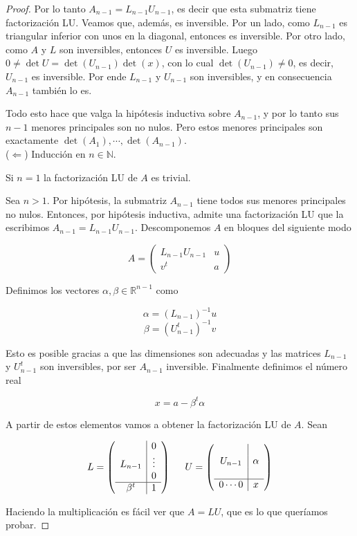 \begin{propo}
\begin{proof}
Por lo tanto $A_{n - 1} = L_{n - 1}U_{n - 1}$, es decir que esta submatriz tiene factorización LU. Veamos que, además, es inversible. Por un lado, como $L_{n - 1}$ es triangular inferior con unos en la diagonal, entonces es inversible. Por otro lado, como $A$ y $L$ son inversibles, entonces $U$ es inversible. Luego $0 \neq \det U = \det(U_{n - 1}) \det(x)$, con lo cual $\det(U_{n - 1}) \neq 0$, es decir, $U_{n - 1}$ es inversible. Por ende $L_{n - 1}$ y $U_{n - 1}$ son inversibles, y en consecuencia $A_{n - 1}$ también lo es.

Todo esto hace que valga la hipótesis inductiva sobre $A_{n - 1}$, y por lo tanto sus $n - 1$ menores principales son no nulos. Pero estos menores principales son exactamente $\det(A_1), \cdots, \det(A_{n - 1})$.\\[0.25cm]

($\Leftarrow$) Inducción en $n \in \mathbb{N}$.

Si $n = 1$ la factorización LU de $A$ es trivial.

Sea $n > 1$. Por hipótesis, la submatriz $A_{n - 1}$ tiene todos sus menores principales no nulos. Entonces, por hipótesis inductiva, admite una factorización LU que la escribimos $A_{n - 1} = L_{n - 1}U_{n - 1}$. Descomponemos $A$ en bloques del siguiente modo

\[A = \left(\begin{array}{c|c}
L_{n - 1} U_{n - 1} & u\\ \hline
v^t & a
\end{array}\right)\]

Definimos los vectores $\alpha, \beta \in \mathbb{R}^{n - 1}$ como

\[\alpha = (L_{n - 1})^{-1}u\]
\[\beta = (U_{n - 1}^t)^{-1} v\]

Esto es posible gracias a que las dimensiones son adecuadas y las matrices $L_{n - 1}$ y $U_{n - 1}^t$ son inversibles, por ser $A_{n - 1}$ inversible. Finalmente definimos el número real

\[x = a - \beta^t \alpha\]

A partir de estos elementos vamos a obtener la factorización LU de $A$. Sean

\[
L = \left(\begin{array}{c|c}
 & 0 \\
L_{n - 1} & \vdots \\
 & 0 \\ \hline
\beta^t & 1
\end{array}\right)
\hspace{0.5cm}
U = \left(\begin{array}{c|c}
 &  \\
U_{n - 1} & \alpha \\
 &  \\ \hline
0 \cdots 0 & x
\end{array}\right)\]

Haciendo la multiplicación es fácil ver que $A = LU$, que es lo que queríamos probar.

\end{proof}
\end{propo}

